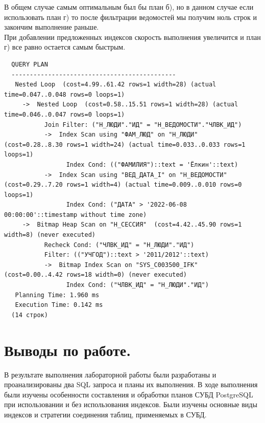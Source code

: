 \documentclass[12pt,onecolumn]{article}
\begin{document}
В общем случае самым оптимальным был бы план б), но в данном случае если использовать план г) то после фильтрации ведомостей мы получим ноль строк и закончим выполнение раньше.\\
При добавлении предложенных индексов скорость выполнения увеличится и план г) все равно остается самым быстрым.
\begin{lstlisting}
  QUERY PLAN
  ---------------------------------------------
   Nested Loop  (cost=4.99..61.42 rows=1 width=28) (actual time=0.047..0.048 rows=0 loops=1)
     ->  Nested Loop  (cost=0.58..15.51 rows=1 width=28) (actual time=0.046..0.047 rows=0 loops=1)
           Join Filter: ("Н_ЛЮДИ"."ИД" = "Н_ВЕДОМОСТИ"."ЧЛВК_ИД")
           ->  Index Scan using "ФАМ_ЛЮД" on "Н_ЛЮДИ"  (cost=0.28..8.30 rows=1 width=24) (actual time=0.033..0.033 rows=1 loops=1)
                 Index Cond: (("ФАМИЛИЯ")::text = 'Ёлкин'::text)
           ->  Index Scan using "ВЕД_ДАТА_I" on "Н_ВЕДОМОСТИ"  (cost=0.29..7.20 rows=1 width=4) (actual time=0.009..0.010 rows=0 loops=1)
                 Index Cond: ("ДАТА" > '2022-06-08 00:00:00'::timestamp without time zone)
     ->  Bitmap Heap Scan on "Н_СЕССИЯ"  (cost=4.42..45.90 rows=1 width=8) (never executed)
           Recheck Cond: ("ЧЛВК_ИД" = "Н_ЛЮДИ"."ИД")
           Filter: (("УЧГОД")::text > '2011/2012'::text)
           ->  Bitmap Index Scan on "SYS_C003500_IFK"  (cost=0.00..4.42 rows=18 width=0) (never executed)
                 Index Cond: ("ЧЛВК_ИД" = "Н_ЛЮДИ"."ИД")
   Planning Time: 1.960 ms
   Execution Time: 0.142 ms
  (14 строк)
\end{lstlisting}
\section{Выводы по работе.}
В результате выполнения лабораторной работы были разработаны и проанализированы
два SQL запроса и планы их выполнения. В ходе выполнения были изучены особенности
составления и обработки планов СУБД PostgreSQL при использовании и без
использования индексов. Были изучены основные виды индексов и стратегии соединения
таблиц, применяемых в СУБД.
\end{document}
